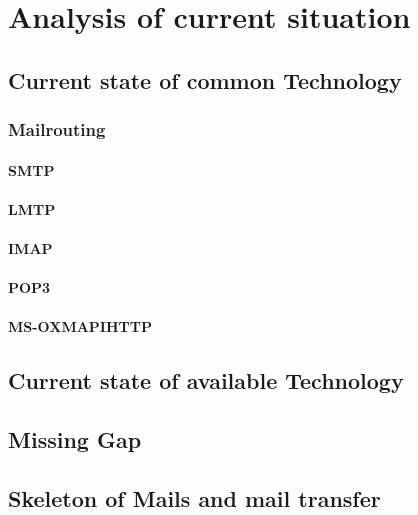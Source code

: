 \chapter{Analysis of current situation\label{chap:analysis}}
\section{Current state of common Technology}
\subsection{Mailrouting}
\subsubsection{SMTP}
\subsubsection{LMTP}
\subsubsection{IMAP}
\subsubsection{POP3}
\subsubsection{MS-OXMAPIHTTP}
\section{Current state of available Technology}
\section{Missing Gap}
\section{Skeleton of Mails and mail transfer}


